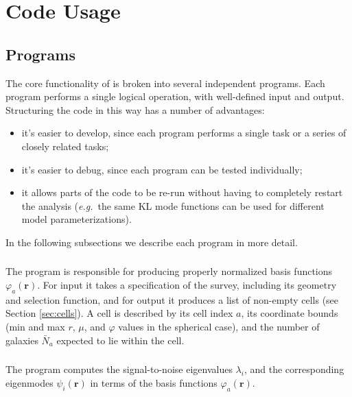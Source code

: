 \documentclass{article}
\newcommand{\opsec}{\protect{\textrm{OPSEC}}\xspace}
\newcommand{\basis}{\protect{\texttt{basis}}\xspace}
\newcommand{\klt}{\protect{\texttt{klt}}\xspace}
\newcommand{\eg}{\textit{e.g.}}
\renewcommand{\vec}[1]{\bm{#1}}
\renewcommand{\r}{\vec{r}}
\renewcommand{\phi}{\varphi}
\begin{document}
\section{Code Usage}
\label{sec:codeusage}

\subsection{Programs}

The core functionality of \opsec is broken into several independent programs.
Each program performs a single logical operation, with well-defined input and
output.  Structuring the code in this way has a number of advantages:
\begin{itemize}
\item it's easier to develop, since each program performs a single task or a
    series of closely related tasks;
\item it's easier to debug, since each program can be tested individually;
\item it allows parts of the code to be re-run without having to completely
    restart the analysis (\eg~the same KL mode functions can be used for
    different model parameterizations).
\end{itemize}

In the following subsections we describe each program in more detail.

\subsubsection{\basis}

The \basis program is responsible for producing properly normalized basis
functions $\phi_a(\r)$.  For input it takes a specification of the survey,
including its geometry and selection function, and for output it produces a
list of non-empty cells (see Section \ref{sec:cells}).  A cell is described by
its cell index $a$, its coordinate bounds (min and max $r$, $\mu$, and $\phi$
values in the spherical case), and the number of galaxies $\bar{N}_a$ expected
to lie within the cell.

\subsubsection{\klt}

The \klt program computes the signal-to-noise eigenvalues $\lambda_i$, and
the corresponding eigenmodes $\psi_i(\r)$ in terms of the basis functions
$\phi_a(\r)$.
\end{document}
